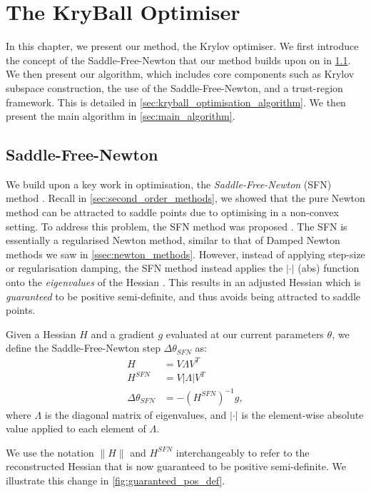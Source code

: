 \chapter{The KryBall Optimiser}
\label{chap:method}

In this chapter, we present our method, the Krylov optimiser. We first introduce the concept of the Saddle-Free-Newton that our method builds upon on in \cref{sec:saddle_free_newton}. We then present our algorithm, which includes core components such as Krylov subspace construction, the use of the Saddle-Free-Newton, and a trust-region framework. This is detailed in \cref{sec:kryball_optimisation_algorithm}. We then present the main algorithm in \cref{sec:main_algorithm}.

\section{Saddle-Free-Newton}
\label{sec:saddle_free_newton}

We build upon a key work in optimisation, the \textit{Saddle-Free-Newton} (SFN) method \citep{dauphin2014sfn}. Recall in \cref{sec:second_order_methods}, we showed that the pure Newton method can be attracted to saddle points due to optimising in a non-convex setting. To address this problem, the SFN method was proposed \citep{dauphin2014sfn}. The SFN is essentially a regularised Newton method, similar to that of Damped Newton methods we saw in \cref{ssec:newton_methods}. However, instead of applying step-size or regularisation damping, the SFN method instead applies the $|\cdot|$ (abs) function onto the \textit{eigenvalues} of the Hessian \cite{dauphin2014sfn}. This results in an adjusted Hessian which is \textit{guaranteed} to be positive semi-definite, and thus avoids being attracted to saddle points. 

\begin{definition}
    Given a Hessian $H$ and a gradient $g$ evaluated at our current parameters $\theta$, we define the Saddle-Free-Newton step $\Delta \theta_{SFN}$ as:
    \begin{align}
        H &= V \Lambda V^T \\
        H^{SFN} &= V |\Lambda| V^T \\
        \Delta \theta_{SFN} &= -(H^{SFN})^{-1} g,
    \end{align}
    where $\Lambda$ is the diagonal matrix of eigenvalues, and $|\cdot|$ is the element-wise absolute value applied to each element of $\Lambda$.
\end{definition}
We use the notation $\| H \|$ and $H^{SFN}$ interchangeably to refer to the reconstructed Hessian that is now guaranteed to be positive semi-definite. We illustrate this change in \cref{fig:guaranteed_pos_def}.

